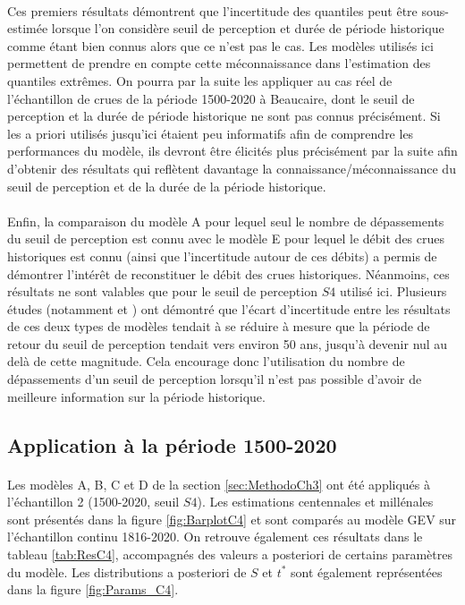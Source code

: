 	\paragraph{} Ces premiers résultats démontrent que l'incertitude des quantiles peut être sous-estimée	lorsque l'on considère seuil de perception et durée de période historique comme étant bien connus alors que ce n'est pas le cas. Les modèles utilisés ici permettent de prendre en compte cette méconnaissance dans l'estimation des quantiles extrêmes. On pourra par la suite les appliquer au cas réel de l'échantillon de crues de la période 1500-2020 à Beaucaire, dont le seuil de perception et la durée de période historique ne sont pas connus précisément. Si les a priori utilisés jusqu'ici étaient peu informatifs afin de comprendre les performances du modèle, ils devront être élicités plus précisément par la suite afin d'obtenir des résultats qui reflètent davantage la connaissance/méconnaissance du seuil de perception et de la durée de la période historique.
		
	\paragraph{} Enfin, la comparaison du modèle A pour lequel seul le nombre de dépassements du seuil de perception est connu avec le modèle E pour lequel le débit des crues historiques est connu (ainsi que l'incertitude autour de ces débits) a permis de démontrer l'intérêt de reconstituer le débit des crues historiques. Néanmoins, ces résultats ne sont valables que pour le seuil de perception $S4$ utilisé ici. Plusieurs études (notamment \citet{stedinger_flood_1986} et \citet{payrastre_usefulness_2011}) ont démontré que l'écart d'incertitude entre les résultats de ces deux types de modèles tendait à se réduire à mesure que la période de retour du seuil de perception tendait vers environ 50 ans, jusqu'à devenir nul au delà de cette magnitude. Cela encourage donc l'utilisation du nombre de dépassements d'un seuil de perception lorsqu'il n'est pas possible d'avoir de meilleure information sur la période historique.
	
	\subsection{Application à la période 1500-2020}
	\label{subsec:Results1500}
	
	\paragraph{} Les modèles A, B, C et D de la section \ref{sec:MethodoCh3} ont été appliqués à l'échantillon 2 (1500-2020, seuil $S4$). Les estimations centennales et millénales sont présentés dans la figure \ref{fig:BarplotC4} et sont comparés au modèle GEV sur l'échantillon continu 1816-2020. On retrouve également ces résultats dans le tableau \ref{tab:ResC4}, accompagnés des valeurs a posteriori de certains paramètres du modèle. Les distributions a posteriori de $S$ et $t^{*}$ sont également représentées dans la figure \ref{fig:Params_C4}.
	

